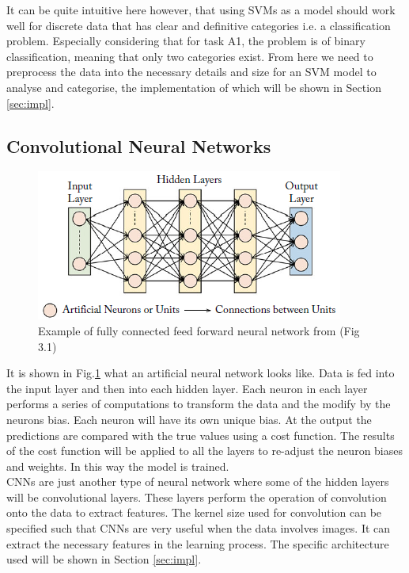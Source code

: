 \documentclass{article}
\begin{document}
    It can be quite intuitive here however, that using SVMs as a model should work well for discrete data that has clear and definitive categories i.e. a classification problem. Especially considering that for task A1, the problem is of binary classification, meaning that only two categories exist. From here we need to preprocess the data into the necessary details and size for an SVM model to analyse and categorise, the implementation of which will be shown in Section \ref{sec:impl}.
    
    \subsection{Convolutional Neural Networks}
    \begin{figure}[htb]
    	\centering
    	\includegraphics[scale=0.7]{Figures/Example_NN.PNG}
    	\caption{Example of fully connected feed forward neural network from \cite{8295029} (Fig 3.1)}
    	\label{fig:example_nn}
    \end{figure}
    
    It is shown in Fig.\ref{fig:example_nn} what an artificial neural network looks like. Data is fed into the input layer and then into each hidden layer. Each neuron in each layer performs a series of computations to transform the data and the modify by the neurons bias. Each neuron will have its own unique bias. At the output the predictions are compared with the true values using a cost function. The results of the cost function will be applied to all the layers to re-adjust the neuron biases and weights. In this way the model is trained.\\
    
    CNNs are just another type of neural network where some of the hidden layers will be convolutional layers. These layers perform the operation of convolution onto the data to extract features. The kernel size used for convolution can be specified such that CNNs are very useful when the data involves images. It can extract the necessary features in the learning process. The specific architecture used will be shown in Section \ref{sec:impl}.\\
    
\end{document}
